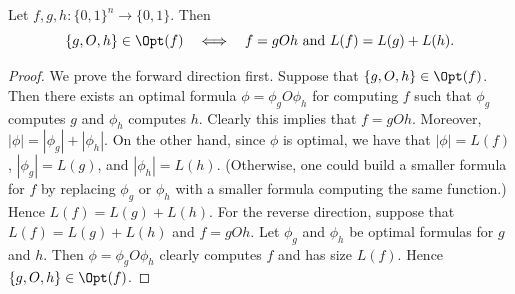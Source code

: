 \begin{ntlemma}
Let $f,g,h:\{0,1\}^n\to\{0,1\}$. Then
\[\{g,O,h\}\in\Opt(f)\quad\Longleftrightarrow\quad f=gOh\text{ and }L(f)=L(g)+L(h).\]
\end{ntlemma}
\begin{proof}
We prove the forward direction first. Suppose that $\{g,O,h\}\in\Opt(f)$. Then there exists an optimal formula $\phi=\phi_gO\phi_h$ for computing $f$ such that $\phi_g$ computes $g$ and $\phi_h$ computes $h$. Clearly this implies that $f=gOh$.
Moreover, $|\phi|=|\phi_g|+|\phi_h|$. On the other hand, since $\phi$ is optimal, we have that $|\phi|=L(f)$, $|\phi_g|=L(g)$, and $|\phi_h|=L(h)$. (Otherwise, one could build a smaller formula for $f$ by replacing $\phi_g$ or $\phi_h$ with a smaller formula computing the same function.) Hence $L(f)=L(g)+L(h)$.
For the reverse direction, suppose that $L(f)=L(g)+L(h)$ and $f=gOh$. Let $\phi_g$ and $\phi_h$ be optimal formulas for $g$ and $h$. Then $\phi=\phi_gO\phi_h$ clearly computes $f$ and has size $L(f)$. Hence $\{g,O,h\}\in\Opt(f)$.
\end{proof}
